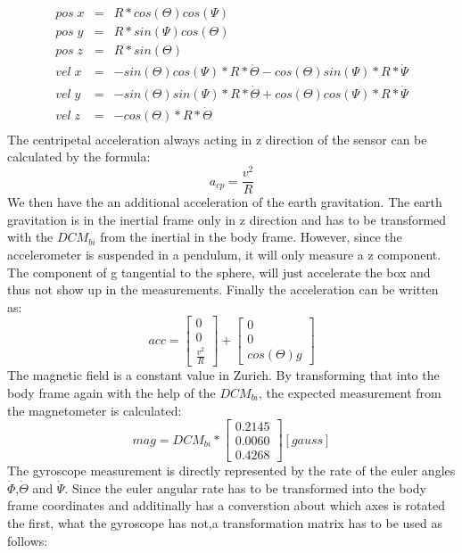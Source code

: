 \begin{eqnarray}
pos\;x&=&R*cos(\Theta)cos(\Psi)\\
pos\;y&=&R*sin(\Psi)cos(\Theta)\\
pos\;z&=&R*sin(\Theta)\\
vel\;x&=&-sin(\Theta)cos(\Psi)*R*\dot{\Theta}-cos(\Theta)sin(\Psi)*R*\dot{\Psi}\\
vel\;y&=&-sin(\Theta)sin(\Psi)*R*\dot{\Theta}+cos(\Theta)cos(\Psi)*R*\dot{\Psi}\\
vel\;z&=&-cos(\Theta)*R*\dot{\Theta}\\
\end{eqnarray}
The centripetal acceleration always acting in z direction of the sensor can be calculated by the formula:
\begin{equation}
a_{cp}=\frac{v^2}{R}
\end{equation}
We then have the an additional acceleration of the earth gravitation. The earth gravitation is in the inertial frame only in z direction and has to be transformed with the $DCM_{bi}$ from the inertial in the body frame. However, since the accelerometer is suspended in a pendulum, it will only measure a z component. The component of g tangential to the sphere, will just accelerate the box and thus not show up in the measurements. Finally the acceleration can be written as:
\begin{equation}
acc= \begin{bmatrix} 0\\0\\ \frac{v^2}{R}\end{bmatrix}+\begin{bmatrix}0\\0\\cos(\Theta) g\end{bmatrix}
\end{equation}
The magnetic field is  a constant value in Zurich. By transforming that into the body frame again with the help of the $DCM_{bi}$, the expected measurement from the magnetometer is calculated:
\begin{equation}
mag= DCM_{bi}* \begin{bmatrix} 0.2145 \\ 0.0060 \\ 0.4268 \end{bmatrix} [gauss]
\end{equation} 
The gyroscope measurement is directly represented by the rate of the euler angles $\dot{\Phi}$,$\dot{\Theta}$ and $\dot{\Psi}$. Since the euler angular rate has to be transformed into the body frame coordinates and additinally has a converstion about which axes is rotated the first, what the gyroscope has not,a transformation matrix has to be used as follows:
